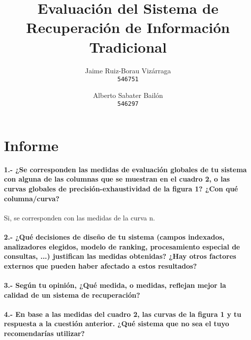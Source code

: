 \documentclass[a4paper]{article}
\begin{document}
\title{Evaluación del Sistema de Recuperación de Información Tradicional}
\author{
	Jaime Ruiz-Borau Vizárraga\\
	\texttt{546751}
	\and
	Alberto Sabater Bailón\\
	\texttt{546297}
	}
\date{}
\maketitle
\section{Informe}
\paragraph{1.- ¿Se corresponden las medidas de evaluación globales de tu sistema con alguna de las columnas que se muestran en el cuadro 2, o las curvas globales de precisión-exhaustividad de la figura 1? ¿Con qué columna/curva?}
\paragraph{}Si, se corresponden con las medidas de la curva n.
\paragraph{2.- ¿Qué decisiones de diseño de tu sistema (campos indexados, analizadores elegidos, modelo de ranking, procesamiento especial de consultas, ...) justifican las medidas obtenidas? ¿Hay otros factores externos que pueden haber afectado a estos resultados?}
\paragraph{}
\paragraph{3.- Según tu opinión, ¿Qué medida, o medidas, reflejan mejor la calidad de un sistema de recuperación?}
\paragraph{}
\paragraph{4.- En base a las medidas del cuadro 2, las curvas de la figura 1 y tu respuesta a la cuestión anterior. ¿Qué sistema que no sea el tuyo recomendarías utilizar?}
\paragraph{}
\end{document}
